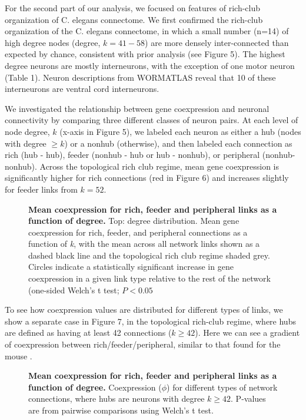 \documentclass[10pt,letterpaper]{article}
\begin{document}
For the second part of our analysis, we focused on features of rich-club organization of C. elegans connectome. We first confirmed the rich-club organization of the C. elegans connectome, in which a small number (n=14) of high degree nodes (degree, $k = 41-58$) are more densely inter-connected than expected by chance, consistent with prior analysis \cite{Towlson2013} (see Figure 5).
The highest degree neurons are mostly interneurons, with the exception of one motor neuron (Table 1).
Neuron descriptions from WORMATLAS reveal that 10 of these interneurons are ventral cord interneurons.

We investigated the relationship between gene coexpression and neuronal connectivity by comparing three different classes of neuron pairs.
At each level of node degree, $k$ (x-axis in Figure 5), we labeled each neuron as either a hub (nodes with degree $\geq k$) or a nonhub (otherwise), and then labeled each connection as rich (hub - hub), feeder (nonhub - hub or hub - nonhub), or peripheral (nonhub- nonhub). Across the topological rich club regime, mean gene coexpression is significantly higher for rich connections (red in Figure 6) and increases slightly for feeder links from $k=52$.

 \begin{figure}[!h]
 \caption{{\bf Mean coexpression for rich, feeder and peripheral links as a function of degree.}
Top: degree distribution. Mean gene coexpression for rich, feeder, and peripheral connections as a function of \textit{k}, with the mean across all network links shown as a dashed black line and the topological rich club regime shaded grey. Circles indicate a statistically significant increase in gene coexpression in a given link type relative to the rest of the network (one-sided Welch’s t test; $P < 0.05$}
 \label{RCdegree}
 \end{figure}

To see how coexpression values are distributed for different types of links, we show a separate case in Figure 7, in the topological rich-club regime, where hubs are defined as having at least 42 connections ($k \geq 42$).
Here we can see a gradient of coexpression between rich/feeder/peripheral, similar to that found for the mouse \cite{Fulcher2015}.

\begin{figure}[!h]
 \caption{{\bf Mean coexpression for rich, feeder and peripheral links as a function of degree.}
Coexpression ($\phi$) for different types of network connections, where hubs are neurons with degree $k \geq 42$. P-values are from pairwise comparisons using Welch’s t test.}
 \label{ViolinPlots}
 \end{figure}
\end{document}
